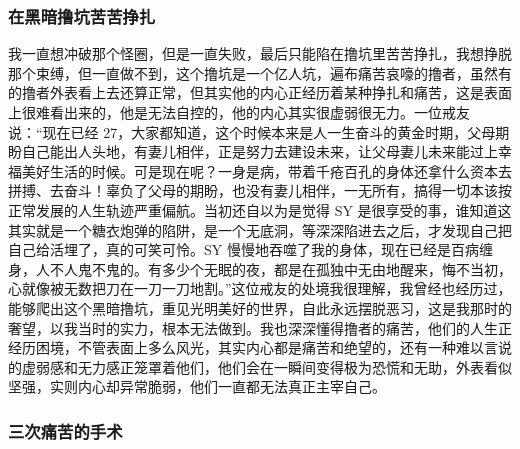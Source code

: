 \subsubsection{在黑暗撸坑苦苦挣扎}

我一直想冲破那个怪圈，但是一直失败，最后只能陷在撸坑里苦苦挣扎，我想挣脱那个束缚，但一直做不到，这个撸坑是一个亿人坑，遍布痛苦哀嚎的撸者，虽然有的撸者外表看上去还算正常，但其实他的内心正经历着某种挣扎和痛苦，这是表面上很难看出来的，他是无法自控的，他的内心其实很虚弱很无力。一位戒友说：“现在已经 27，大家都知道，这个时候本来是人一生奋斗的黄金时期，父母期盼自己能出人头地，有妻儿相伴，正是努力去建设未来，让父母妻儿未来能过上幸福美好生活的时候。可是现在呢？一身是病，带着千疮百孔的身体还拿什么资本去拼搏、去奋斗！辜负了父母的期盼，也没有妻儿相伴，一无所有，搞得一切本该按正常发展的人生轨迹严重偏航。当初还自以为是觉得 SY 是很享受的事，谁知道这其实就是一个糖衣炮弹的陷阱，是一个无底洞，等深深陷进去之后，才发现自己把自己给活埋了，真的可笑可怜。SY 慢慢地吞噬了我的身体，现在已经是百病缠身，人不人鬼不鬼的。有多少个无眠的夜，都是在孤独中无由地醒来，悔不当初，心就像被无数把刀在一刀一刀地割。”这位戒友的处境我很理解，我曾经也经历过，能够爬出这个黑暗撸坑，重见光明美好的世界，自此永远摆脱恶习，这是我那时的奢望，以我当时的实力，根本无法做到。我也深深懂得撸者的痛苦，他们的人生正经历困境，不管表面上多么风光，其实内心都是痛苦和绝望的，还有一种难以言说的虚弱感和无力感正笼罩着他们，他们会在一瞬间变得极为恐慌和无助，外表看似坚强，实则内心却异常脆弱，他们一直都无法真正主宰自己。

\subsubsection{三次痛苦的手术}

